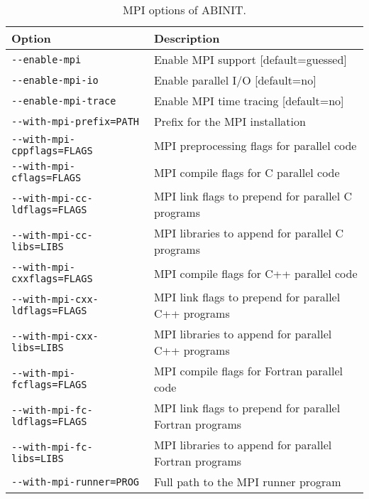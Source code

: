 \begin{table}
\begin{center}
\begin{tabular}{|l|l|}
\hline
\textbf{Option} & \textbf{Description} \\
\hline
\texttt{-{-}enable-mpi}                 & Enable MPI support [default=guessed] \\
\texttt{-{-}enable-mpi-io}              & Enable parallel I/O [default=no] \\
\texttt{-{-}enable-mpi-trace}           & Enable MPI time tracing [default=no] \\
\hline
\texttt{-{-}with-mpi-prefix=PATH}       & Prefix for the MPI installation \\
\hline
\texttt{-{-}with-mpi-cppflags=FLAGS}    & MPI preprocessing flags for parallel code \\
\hline
\texttt{-{-}with-mpi-cflags=FLAGS}      & MPI compile flags for C parallel code \\
\texttt{-{-}with-mpi-cc-ldflags=FLAGS}  & MPI link flags to prepend for parallel C programs \\
\texttt{-{-}with-mpi-cc-libs=LIBS}     & MPI libraries to append for parallel C programs \\
\hline
\texttt{-{-}with-mpi-cxxflags=FLAGS}    & MPI compile flags for C++ parallel code \\
\texttt{-{-}with-mpi-cxx-ldflags=FLAGS}  & MPI link flags to prepend for parallel C++ programs \\
\texttt{-{-}with-mpi-cxx-libs=LIBS}     & MPI libraries to append for parallel C++ programs \\
\hline
\texttt{-{-}with-mpi-fcflags=FLAGS}     & MPI compile flags for Fortran parallel code \\
\texttt{-{-}with-mpi-fc-ldflags=FLAGS}  & MPI link flags to prepend for parallel Fortran programs \\
\texttt{-{-}with-mpi-fc-libs=LIBS}     & MPI libraries to append for parallel Fortran programs \\
\hline
\texttt{-{-}with-mpi-runner=PROG}       & Full path to the MPI runner program \\
\hline
\end{tabular}
\end{center}
\caption{MPI options of ABINIT.}
\label{tab:opt-mpi}
\end{table}

